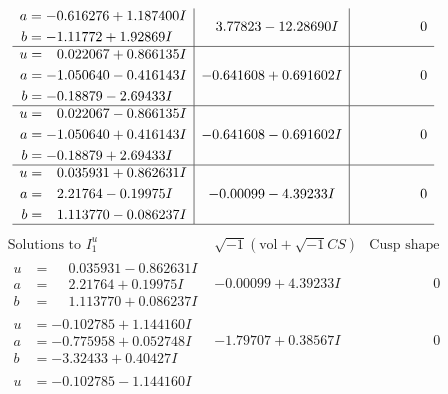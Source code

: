 \documentclass[1p]{elsarticle_modified}
\theoremstyle{definition}
\newcommand{\I}{\sqrt{-1}}
\begin{document}
$$\begin{array}{c|c|c}
\begin{aligned}
a &= -0.616276 + 1.187400 I \\
b &= -1.11772 + 1.92869 I\end{aligned}
 & \phantom{-}3.77823 - 12.28690 I & \phantom{-0.000000 } 0 \\ \hline\begin{aligned}
u &= \phantom{-}0.022067 + 0.866135 I \\
a &= -1.050640 - 0.416143 I \\
b &= -0.18879 - 2.69433 I\end{aligned}
 & -0.641608 + 0.691602 I & \phantom{-0.000000 } 0 \\ \hline\begin{aligned}
u &= \phantom{-}0.022067 - 0.866135 I \\
a &= -1.050640 + 0.416143 I \\
b &= -0.18879 + 2.69433 I\end{aligned}
 & -0.641608 - 0.691602 I & \phantom{-0.000000 } 0 \\ \hline\begin{aligned}
u &= \phantom{-}0.035931 + 0.862631 I \\
a &= \phantom{-}2.21764 - 0.19975 I \\
b &= \phantom{-}1.113770 - 0.086237 I\end{aligned}
 & -0.00099 - 4.39233 I & \phantom{-0.000000 } 0\\
 \hline 
 \end{array}$$\newpage$$\begin{array}{c|c|c}  
\text{Solutions to }I^u_{1}& \I (\text{vol} + \sqrt{-1}CS) & \text{Cusp shape}\\
 \hline 
\begin{aligned}
u &= \phantom{-}0.035931 - 0.862631 I \\
a &= \phantom{-}2.21764 + 0.19975 I \\
b &= \phantom{-}1.113770 + 0.086237 I\end{aligned}
 & -0.00099 + 4.39233 I & \phantom{-0.000000 } 0 \\ \hline\begin{aligned}
u &= -0.102785 + 1.144160 I \\
a &= -0.775958 + 0.052748 I \\
b &= -3.32433 + 0.40427 I\end{aligned}
 & -1.79707 + 0.38567 I & \phantom{-0.000000 } 0 \\ \hline\begin{aligned}
u &= -0.102785 - 1.144160 I \\

\end{aligned}
\end{array}$$
\end{document}
